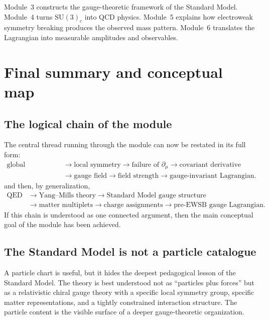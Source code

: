\documentclass[11pt,a4paper]{article}
\newcommand{\p}{\partial}
\newcommand{\SUc}{\mathrm{SU}(3)_c}
\begin{document}
\begin{takehomebox}
\vspace{0.25cm}
Module~3 constructs the gauge-theoretic framework of the Standard Model. Module~4 turns \(\SUc\) into QCD physics. Module~5 explains how electroweak symmetry breaking produces the observed mass pattern. Module~6 translates the Lagrangian into measurable amplitudes and observables.
\end{takehomebox}



\section{Final summary and conceptual map}

\subsection{The logical chain of the module}

The central thread running through the module can now be restated in its full form:
\[
\begin{aligned}
\text{global symmetry}
&\longrightarrow \text{local symmetry}
\longrightarrow \text{failure of }\p_\mu
\longrightarrow \text{covariant derivative} \\
&\longrightarrow \text{gauge field}
\longrightarrow \text{field strength}
\longrightarrow \text{gauge-invariant Lagrangian}.
\end{aligned}
\]
and then, by generalization,
\[
\begin{aligned}
\text{QED}
&\longrightarrow \text{Yang--Mills theory}
\longrightarrow \text{Standard Model gauge structure} \\
&\longrightarrow \text{matter multiplets}
\longrightarrow \text{charge assignments}
\longrightarrow \text{pre-EWSB gauge Lagrangian}.
\end{aligned}
\]
If this chain is understood as one connected argument, then the main conceptual goal of the module has been achieved.




\subsection{The Standard Model is not a particle catalogue}

A particle chart is useful, but it hides the deepest pedagogical lesson of the Standard Model. The theory is best understood not as ``particles plus forces'' but as a relativistic chiral gauge theory with a specific local symmetry group, specific matter representations, and a tightly constrained interaction structure. The particle content is the visible surface of a deeper gauge-theoretic organization.
\end{document}
